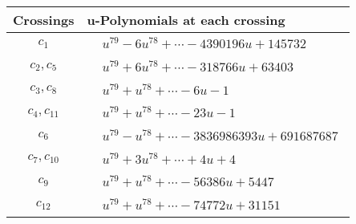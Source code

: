 \documentclass[1p]{elsarticle_modified}
\theoremstyle{definition}
\begin{document}
\begin{tabular}{m{50pt}|m{274pt}}
Crossings & \hspace{64pt}u-Polynomials at each crossing \\
\hline $$\begin{aligned}c_{1}\end{aligned}$$&$\begin{aligned}
&u^{79}-6 u^{78}+\cdots-4390196 u+145732
\end{aligned}$\\
\hline $$\begin{aligned}c_{2},c_{5}\end{aligned}$$&$\begin{aligned}
&u^{79}+6 u^{78}+\cdots-318766 u+63403
\end{aligned}$\\
\hline $$\begin{aligned}c_{3},c_{8}\end{aligned}$$&$\begin{aligned}
&u^{79}+u^{78}+\cdots-6 u-1
\end{aligned}$\\
\hline $$\begin{aligned}c_{4},c_{11}\end{aligned}$$&$\begin{aligned}
&u^{79}+u^{78}+\cdots-23 u-1
\end{aligned}$\\
\hline $$\begin{aligned}c_{6}\end{aligned}$$&$\begin{aligned}
&u^{79}- u^{78}+\cdots-3836986393 u+691687687
\end{aligned}$\\
\hline $$\begin{aligned}c_{7},c_{10}\end{aligned}$$&$\begin{aligned}
&u^{79}+3 u^{78}+\cdots+4 u+4
\end{aligned}$\\
\hline $$\begin{aligned}c_{9}\end{aligned}$$&$\begin{aligned}
&u^{79}+u^{78}+\cdots-56386 u+5447
\end{aligned}$\\
\hline $$\begin{aligned}c_{12}\end{aligned}$$&$\begin{aligned}
&u^{79}+u^{78}+\cdots-74772 u+31151
\end{aligned}$\\
\hline
\end{tabular}\\~\\
\end{document}
